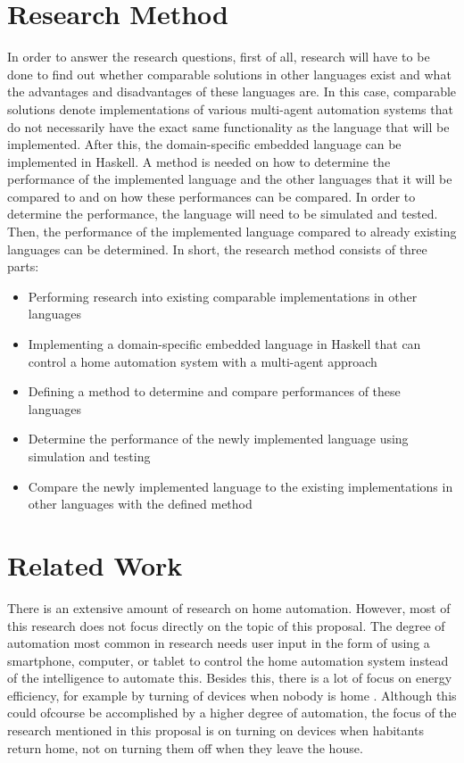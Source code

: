 \documentclass{sig-alternate-br}
\begin{document}
\section{Research Method}
In order to answer the research questions, first of all, research will have to be done to find out whether comparable solutions in other languages exist and what the advantages and disadvantages of these languages are. In this case, comparable solutions denote implementations of various multi-agent automation systems that do not necessarily have the exact same functionality as the language that will be implemented. After this, the domain-specific embedded language can be implemented in Haskell. A method is needed on how to determine the performance of the implemented language and the other languages that it will be compared to and on how these performances can be compared. In order to determine the performance, the language will need to be simulated and tested. Then, the performance of the implemented language compared to already existing languages can be determined. In short, the research method consists of three parts:
\begin{itemize}
\item Performing research into existing comparable implementations in other languages
\item Implementing a domain-specific embedded language in Haskell that can control a home automation system with a multi-agent approach
\item Defining a method to determine and compare performances of these languages
\item Determine the performance of the newly implemented language using simulation and testing
\item Compare the newly implemented language to the existing implementations in other languages with the defined method
\end{itemize}
\balancecolumns 
\section{Related Work}
There is an extensive amount of research on home automation. However, most of this research does not focus directly on the topic of this proposal.  The degree of automation most common in research needs user input in the form of using a smartphone, computer, or tablet to control the home automation system instead of the intelligence to automate this. Besides this, there is a lot of focus on energy efficiency, for example by turning of devices when nobody is home \cite{sha}. Although this could ofcourse be accomplished by a higher degree of automation, the focus of the research mentioned in this proposal is on turning on devices when habitants return home, not on turning them off when they leave the house. \cite{ssm}
\end{document}
